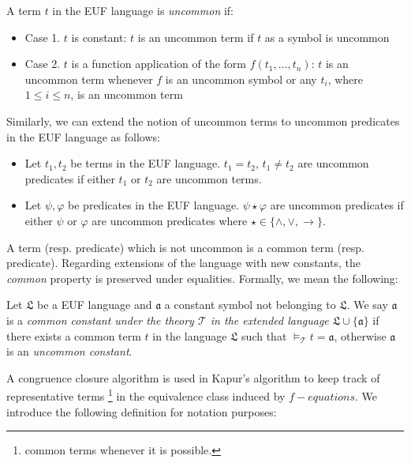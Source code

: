 \begin{definition}
  A term $t$ in the EUF language is \emph{uncommon} if:
  \begin{itemize}
    \item Case 1. $t$ is constant: $t$ is an uncommon term if
      $t$ as a symbol is uncommon
    \item Case 2. $t$ is a function application of the form 
      $f(t_1, \dots, t_n)$:
      $t$ is an uncommon term whenever $f$ is an uncommon 
      symbol or any $t_i$,
      where $1 \leq i \leq n$,
      is an uncommon term
  \end{itemize}

  Similarly, we can extend the notion of uncommon terms to uncommon 
  predicates in the EUF language as follows:

  \begin{itemize}
    \item Let $t_1, t_2$ be terms in the EUF language. $t_1 = t_2$,
      $t_1 \neq t_2$ are uncommon predicates if either $t_1$ or $t_2$
      are uncommon terms.
    \item Let $\psi, \varphi$ be predicates in the EUF language. 
      $\psi \star \varphi$ are uncommon predicates if either $\psi$
      or $\varphi$ are uncommon predicates where $\star \in \{ \land,
        \lor, \rightarrow \}$. 

  \end{itemize}
\end{definition}


A term (resp. predicate) which is not uncommon is a 
common term (resp. predicate).
Regarding extensions of the language with new constants, 
the \emph{common} property
is preserved under equalities. Formally, we mean the following:

\begin{definition}
  Let $\mathfrak{L}$ be a EUF language and $\mathfrak{a}$ a constant symbol
  not belonging to $\mathfrak{L}$. We say $\mathfrak{a}$ is a \emph{common constant under
  the theory $\mathcal{T}$ in the extended language $\mathfrak{L} \cup \{\mathfrak{a}\}$}
  if there exists a common term $t$ in the language $\mathfrak{L}$ such that 
  $\models_{\mathcal{T}} t = \mathfrak{a}$, otherwise $\mathfrak{a}$ is an \emph{
  uncommon constant}.
\end{definition}

A congruence closure algorithm is used in Kapur's algorithm
to keep track of representative terms \footnote{common terms
whenever it is possible.} in the equivalence class
induced by $f-equations$.
We introduce the following definition for notation purposes:


